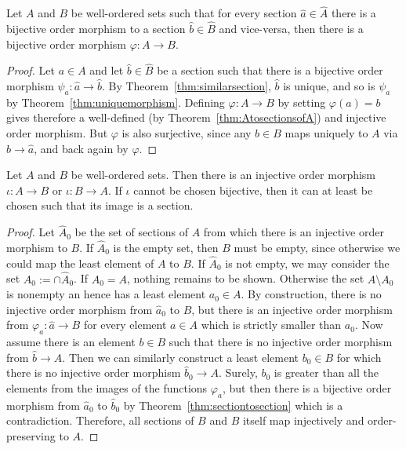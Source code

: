 \documentclass[12pt]{article}
\newcommand{\<}{\langle}
\renewcommand{\>}{\rangle}
\newcommand{\h}{\widehat}
\begin{document}
\begin{thm}
\label{thm:sectiontosection}
Let $A$ and $B$ be well-ordered sets such that for every section
$\h{a}\in\h{A}$ there is a bijective order morphism to a section
$\h{b}\in\h{B}$ and vice-versa, then there is a bijective order
morphism $\varphi\colon A\to B$.
\end{thm}
\begin{proof}
Let $a\in A$ and let $\h{b}\in\h{B}$ be a section such that there is a
bijective order morphism $\psi_a\colon\h{a}\to\h{b}$. By
Theorem~\ref{thm:similarsection}, $\h{b}$ is unique, and so is
$\psi_a$ by Theorem~\ref{thm:uniquemorphism}. Defining
$\varphi\colon A\to B$ by setting $\varphi(a)=b$ gives therefore a
well-defined (by Theorem~\ref{thm:AtosectionsofA}) and injective order
morphism. But $\varphi$ is also surjective, since any $b\in B$ maps
uniquely to $A$ via $\h{b}\to\h{a}$, and back again by $\varphi$.
\end{proof}

\begin{thm}
\label{thm:comparable}
Let $A$ and $B$ be well-ordered sets. Then there is an injective order
morphism $\iota\colon A\to B$ or $\iota\colon B\to A$. If $\iota$
cannot be chosen bijective, then it can at least be chosen such that
its image is a section.
\end{thm}
\begin{proof}
Let $\h{A}_0$ be the set of sections of $A$ from which there is an
injective order morphism to $B$. If $\h{A}_0$ is the empty set, then
$B$ must be empty, since otherwise we could map the least element of
$A$ to $B$. If $\h{A}_0$ is not empty, we may consider the set
$A_0:=\cap\h{A}_0$. If $A_0=A$, nothing remains to be shown. Otherwise
the set $A\setminus A_0$ is nonempty an hence has a least element
$a_0\in A$. By construction, there is no injective order morphism from
$\h{a}_0$ to $B$, but there is an injective order morphism from
$\varphi_a\colon\h{a}\to B$ for every element $a\in A$ which is
strictly smaller than $a_0$. Now assume there is an element $b\in B$
such that there is no injective order morphism from $\h{b}\to
A$. Then we can similarly construct a least element $b_0\in B$ for
which there is no injective order morphism $\h{b}_0\to A$. Surely,
$b_0$ is greater than all the elements from the images of the
functions $\varphi_a$, but then there is a bijective order
morphism from $\h{a}_0$ to $\h{b}_0$ by
Theorem~\ref{thm:sectiontosection} which is a
contradiction. Therefore, all sections of $B$ and $B$ itself
map injectively and order-preserving to $A$.
\end{proof}
\end{document}
